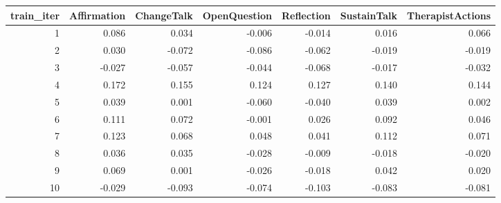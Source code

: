 \begin{tabular}{rrrrrrr}
\toprule
train\_iter & Affirmation & ChangeTalk & OpenQuestion & Reflection & SustainTalk & TherapistActions \\
\midrule
1 & 0.086 & 0.034 & -0.006 & -0.014 & 0.016 & 0.066 \\
2 & 0.030 & -0.072 & -0.086 & -0.062 & -0.019 & -0.019 \\
3 & -0.027 & -0.057 & -0.044 & -0.068 & -0.017 & -0.032 \\
4 & 0.172 & 0.155 & 0.124 & 0.127 & 0.140 & 0.144 \\
5 & 0.039 & 0.001 & -0.060 & -0.040 & 0.039 & 0.002 \\
6 & 0.111 & 0.072 & -0.001 & 0.026 & 0.092 & 0.046 \\
7 & 0.123 & 0.068 & 0.048 & 0.041 & 0.112 & 0.071 \\
8 & 0.036 & 0.035 & -0.028 & -0.009 & -0.018 & -0.020 \\
9 & 0.069 & 0.001 & -0.026 & -0.018 & 0.042 & 0.020 \\
10 & -0.029 & -0.093 & -0.074 & -0.103 & -0.083 & -0.081 \\
\bottomrule
\end{tabular}
